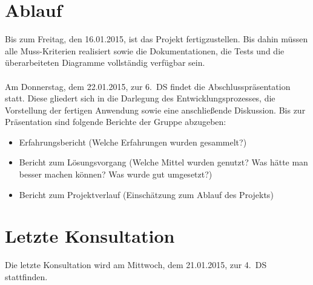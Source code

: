 \documentclass{scrartcl}
\begin{document}
\section{Ablauf}
Bis zum Freitag, den 16.01.2015, ist das Projekt fertigzustellen. Bis dahin müssen alle Muss-Kriterien realisiert sowie die Dokumentationen, die Tests und die überarbeiteten Diagramme vollständig verfügbar sein.\\\\
Am Donnerstag, dem 22.01.2015, zur 6.~DS findet die Abschlusspräsentation statt. Diese gliedert sich in die Darlegung des Entwicklungsprozesses, die Vorstellung der fertigen Anwendung sowie eine anschließende Diskussion.\newpage
Bis zur Präsentation sind folgende Berichte der Gruppe abzugeben:
\begin{itemize}
\itemsep 0pt
\item Erfahrungsbericht (Welche Erfahrungen wurden gesammelt?)
\item Bericht zum Lösungsvorgang (Welche Mittel wurden genutzt? Was hätte man besser machen können? Was wurde gut umgesetzt?)
\item Bericht zum Projektverlauf (Einschätzung zum Ablauf des Projekts)
\end{itemize}

\vspace{1em}

\section{Letzte Konsultation}
Die letzte Konsultation wird am Mittwoch, dem 21.01.2015, zur 4.~DS stattfinden.
\end{document}

